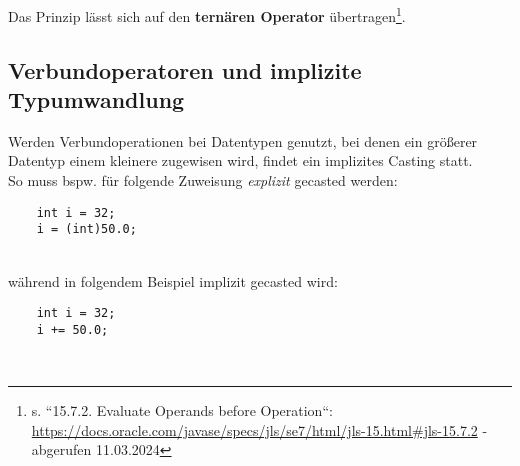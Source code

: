 \noindent
Das Prinzip lässt sich auf den \textbf{ternären Operator}  übertragen\footnote{
s. ``15.7.2. Evaluate Operands before Operation``: \url{https://docs.oracle.com/javase/specs/jls/se7/html/jls-15.html#jls-15.7.2} - abgerufen 11.03.2024
}.


\subsection{Verbundoperatoren und implizite Typumwandlung}

Werden Verbundoperationen bei Datentypen genutzt, bei denen ein größerer Datentyp einem kleinere zugewisen wird, findet ein implizites Casting statt.\\

\noindent
So muss bspw. für folgende Zuweisung \textit{explizit} gecasted werden:

\begin{verbatim}
    int i = 32;
    i = (int)50.0;
\end{verbatim}\\

während in folgendem Beispiel implizit gecasted wird:

\begin{verbatim}
    int i = 32;
    i += 50.0;
\end{verbatim}\\
